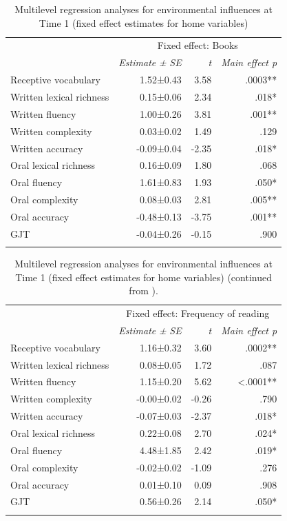 \documentclass[output=paper,modfonts,nonflat,newtxmath]{langsci/langscibook}
\begin{document}
\begin{paperappendix}
\begin{table}
\caption{\label{tab:pfenninger:14} Multilevel regression analyses for environmental influences at Time 1 (fixed effect estimates for home variables)}

\begin{tabularx}{.84\textwidth}{l rrr}
\lsptoprule
& \multicolumn{3}{c}{Fixed effect: Books}\\
\cmidrule{2-4}
 & \textit{Estimate} \textit{±} \textit{SE} & \textit{t}  & \textit{Main effect p}\\
\cmidrule{1-4}
Receptive vocabulary & 1.52±0.43 & 3.58 & .0003** \\
Written lexical richness & 0.15±0.06 & 2.34 & .018*  \\
Written fluency & 1.00±0.26 & 3.81 & .001**  \\
Written complexity & 0.03±0.02 & 1.49 & .129  \\
Written accuracy & -0.09±0.04 & -2.35 & .018*  \\
Oral lexical richness & 0.16±0.09 & 1.80 & .068\\
Oral fluency & 1.61±0.83 & 1.93 & .050*  \\
Oral complexity & 0.08±0.03 & 2.81 & .005**  \\
Oral accuracy & -0.48±0.13 & -3.75 & .001**  \\
GJT & -0.04±0.26 & -0.15 & .900 \\
	\lspbottomrule
\end{tabularx}
\end{table}

\begin{table}
	\caption{\label{tab:pfenninger:15} Multilevel regression analyses for environmental influences at Time 1 (fixed effect estimates for home variables) (continued from ).}
	\begin{tabularx}{.84\textwidth}{X rrr}
		\lsptoprule
		& \multicolumn{3}{c}{Fixed effect: Frequency of reading}\\
		\cmidrule{2-4}
		& \textit{Estimate} \textit{±} \textit{SE} & \textit{t}  & \textit{Main effect p}\\
		\cmidrule{1-4}
		Receptive vocabulary & 1.16±0.32 & 3.60 & .0002** \\
		Written lexical richness & 0.08±0.05 & 1.72 & .087 \\
		Written fluency & 1.15±0.20 & 5.62 & <.0001** \\
		Written complexity & -0.00±0.02 & -0.26 & .790 \\
		Written accuracy & -0.07±0.03 & -2.37 & .018* \\
		Oral lexical richness & 0.22±0.08 & 2.70 & .024*\\
		Oral fluency & 4.48±1.85 & 2.42 & .019* \\
		Oral complexity & -0.02±0.02 & -1.09 & .276 \\
		Oral accuracy & 0.01±0.10 & 0.09 & .908 \\
		GJT & 0.56±0.26 & 2.14 & .050* \\
			\lspbottomrule
	\end{tabularx}


\end{table}
\end{paperappendix}
\end{document}
